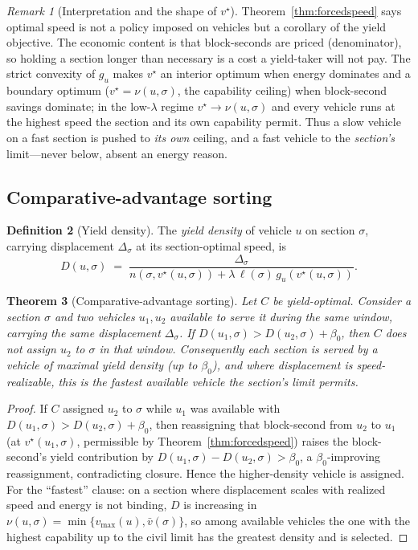 \documentclass[11pt,twocolumn,a4paper]{article}
\newtheorem{theorem}{Theorem}[section]
\theoremstyle{definition}
\newtheorem{definition}[theorem]{Definition}
\theoremstyle{remark}
\newtheorem{remark}[theorem]{Remark}
\newcommand{\blocktime}{\beta_0}
\begin{document}
\begin{remark}[Interpretation and the shape of $v^\star$]
Theorem~\ref{thm:forcedspeed} says optimal speed is not a policy imposed on vehicles but a corollary of the yield objective. The economic content is that block-seconds are priced (denominator), so holding a section longer than necessary is a cost a yield-taker will not pay. The strict convexity of $g_u$ makes $v^\star$ an interior optimum when energy dominates and a boundary optimum ($v^\star=\nu(u,\sigma)$, the capability ceiling) when block-second savings dominate; in the low-$\lambda$ regime $v^\star\to\nu(u,\sigma)$ and every vehicle runs at the highest speed the section and its own capability permit. Thus a slow vehicle on a fast section is pushed to \emph{its own} ceiling, and a fast vehicle to the \emph{section's} limit---never below, absent an energy reason.
\end{remark}

\subsection{Comparative-advantage sorting}

\begin{definition}[Yield density]
\label{def:yielddensity}
The \emph{yield density} of vehicle $u$ on section $\sigma$, carrying displacement $\Delta_\sigma$ at its section-optimal speed, is
\begin{equation}
D(u,\sigma) \;=\; \frac{\Delta_\sigma}{n(\sigma,v^\star(u,\sigma)) + \lambda\,\ell(\sigma)\,g_u(v^\star(u,\sigma))}.
\end{equation}
\end{definition}

\begin{theorem}[Comparative-advantage sorting]
\label{thm:sorting}
Let $C$ be yield-optimal. Consider a section $\sigma$ and two vehicles $u_1,u_2$ available to serve it during the same window, carrying the same displacement $\Delta_\sigma$. If $D(u_1,\sigma) > D(u_2,\sigma) + \blocktime$, then $C$ does not assign $u_2$ to $\sigma$ in that window. Consequently each section is served by a vehicle of maximal yield density (up to $\blocktime$), and where displacement is speed-realizable, this is the fastest available vehicle the section's limit permits.
\end{theorem}

\begin{proof}
If $C$ assigned $u_2$ to $\sigma$ while $u_1$ was available with $D(u_1,\sigma) > D(u_2,\sigma)+\blocktime$, then reassigning that block-second from $u_2$ to $u_1$ (at $v^\star(u_1,\sigma)$, permissible by Theorem~\ref{thm:forcedspeed}) raises the block-second's yield contribution by $D(u_1,\sigma)-D(u_2,\sigma) > \blocktime$, a $\blocktime$-improving reassignment, contradicting closure. Hence the higher-density vehicle is assigned. For the ``fastest'' clause: on a section where displacement scales with realized speed and energy is not binding, $D$ is increasing in $\nu(u,\sigma)=\min\{v_{\max}(u),\bar v(\sigma)\}$, so among available vehicles the one with the highest capability up to the civil limit has the greatest density and is selected.
\end{proof}
\end{document}
